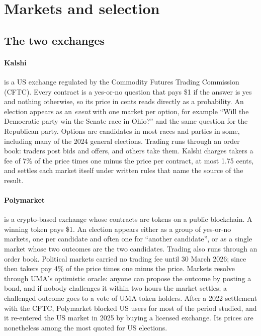 \section{Markets and selection}\label{sec:data}

\subsection{The two exchanges}

\paragraph{Kalshi} is a US exchange regulated by the Commodity Futures Trading Commission (CFTC). Every contract is a
yes-or-no question that pays \$1 if the answer is yes and nothing otherwise, so its price in cents reads directly as a
probability. An election appears as an \emph{event} with one market per option, for example ``Will the Democratic party
win the Senate race in Ohio?'' and the same question for the Republican party. Options are candidates in most races
and parties in some, including many of the 2024 general elections. Trading runs through an order book: traders post
bids and offers, and others take them. Kalshi charges takers a fee of 7\% of the price times one minus the price per
contract, at most 1.75 cents, and settles each market itself under written rules that name the source of the result.

\paragraph{Polymarket} is a crypto-based exchange whose contracts are tokens on a public blockchain. A winning token
pays \$1. An election appears either as a group of yes-or-no markets, one per candidate and often one for ``another
candidate'', or as a single market whose two outcomes are the two candidates. Trading also runs through an order book.
Political markets carried no trading fee until 30 March 2026; since then takers pay 4\% of the price times one minus the
price. Markets resolve through UMA's optimistic oracle: anyone can propose the outcome by posting a bond, and if nobody
challenges it within two hours the market settles; a challenged outcome goes to a vote of UMA token holders. After a
2022 settlement with the CFTC, Polymarket blocked US users for most of the period studied, and it re-entered the US
market in 2025 by buying a licensed exchange. Its prices are nonetheless among the most quoted for US elections.

